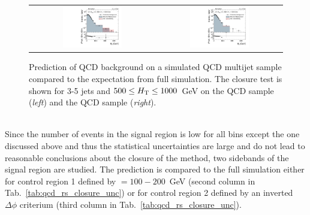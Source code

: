 \begin{figure}[!t]
  \centering
  \begin{tabular}{cc}
                \includegraphics[width=0.49\textwidth]{figures/MHT_JetBin2_HTlow_madgraph_DR53X_chs_TuneZ2star_pt10_withoutPUReweighting_UseRebCorrection_v1.pdf} &
                \includegraphics[width=0.49\textwidth]{figures/MHT_JetBin2_HTlow_pythia_DR53X_chs_TuneZ2star_pt10_withoutPUReweighting_UseRebCorrection_v1.pdf}\\
  \end{tabular}
  \caption{Prediction of QCD background on a simulated QCD multijet sample compared to the expectation from full simulation. The closure test is shown for 3-5 jets and $ 500 \leq H_{\text{T}} \leq 1000$~GeV on the \madgraph QCD sample (\textit{left}) and the \pythia QCD sample (\textit{right}).}
  \label{fig:qcd_rs_closure_comp}
\end{figure}
\\
Since the number of events in the signal region is low for all bins except the one discussed above and thus the statistical uncertainties are large and do not lead to reasonable conclusions about the closure of the method, two sidebands of the signal region are studied. The prediction is compared to the full simulation either for control region 1 defined by \MHT $= 100 - 200$~GeV (second column in Tab.~\ref{tab:qcd_rs_closure_unc}) or for control region 2 defined by an inverted $\Delta \phi$ criterium (third column in Tab.~\ref{tab:qcd_rs_closure_unc}). 
